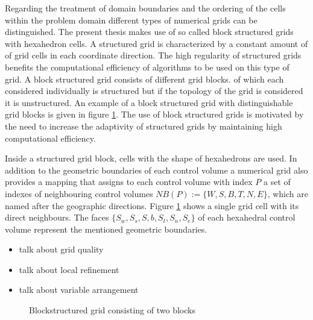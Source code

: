     Regarding the treatment of domain boundaries and the ordering of the cells within the problem domain different types of numerical grids can be distinguished. The present thesis makes use of so called block structured grids with hexahedron cells. A structured grid is characterized by a constant amount of of grid cells in each coordinate direction. The high regularity of structured grids benefits the computational efficiency of algorithms to be used on this type of grid. A block structured grid consists of different grid blocks. of which each considered individually is structured but if the topology of the grid is considered it is unstructured. An example of a block structured grid with distinguishable grid blocks is given in figure \ref{fig:blockstruc}. The use of block structured grids is motivated by the need to increase the adaptivity of structured grids by maintaining high computational efficiency. 

    Inside a structured grid block, cells with the shape of hexahedrons are used. In addition to the geometric boundaries of each control volume a numerical grid also provides a mapping that assigns to each control volume with index \(P\) a set of indexes of neighbouring control volumes \(NB(P):=\{W,S,B,T,N,E\}\), which are named after the geographic directions. Figure \ref{fig:blockstruc} shows a single grid cell with its direct neighbours. The faces \(\{S_w,S_s,S,b,S_t,S_n,S_e\}\) of each hexahedral control volume represent the mentioned geometric boundaries. 

    \begin{itemize}
      \item talk about grid quality
      \item talk about local refinement
      \item talk about variable arrangement
    \end{itemize}

    \begin{figure}[h]
      \label{fig:blockstruc}
      \qquad
      \caption{Blockstructured grid consisting of two blocks}
     \end{figure}
    
